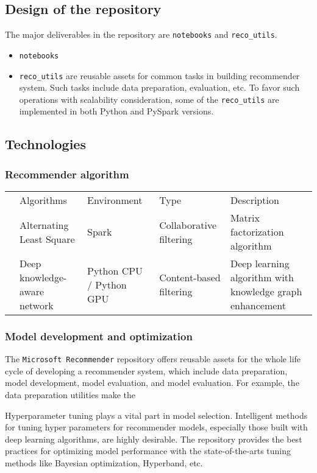 \documentclass[twoside,11pt]{article}
\begin{document}
\subsection{Design of the repository}
The major deliverables in the repository are \verb|notebooks| and \verb|reco_utils|.

\begin{itemize}
 \item \verb|notebooks|
 \item \verb|reco_utils| are reusable assets for common tasks in building recommender system. Such tasks include data preparation, evaluation, etc. To favor such operations with scalability consideration, some of the \verb|reco_utils| are implemented in both Python and PySpark versions.
\end{itemize}

\subsection{Technologies}
\subsubsection{Recommender algorithm}
\begin{table}[]
\begin{tabular}{lllll}
 & Algorithms  & Environment & Type & Description \\
 & Alternating Least Square & Spark & Collaborative filtering & Matrix factorization algorithm \\
 & Deep knowledge-aware network & Python CPU / Python GPU & Content-based filtering & Deep learning algorithm with knowledge graph enhancement  \\
\end{tabular}
\end{table}

\subsubsection{Model development and optimization}
The \verb|Microsoft Recommender| repository offers reusable assets for the whole life cycle of developing a recommender system, which include data preparation, model development, model evaluation, and model evaluation. For example, the data preparation utilities make the  

Hyperparameter tuning plays a vital part in model selection. Intelligent methods for tuning hyper parameters for recommender models, especially those built with deep learning algorithms, are highly desirable. The repository provides the best practices for optimizing model performance with the state-of-the-arts tuning methods like Bayesian optimization, Hyperband, etc.
\end{document}
